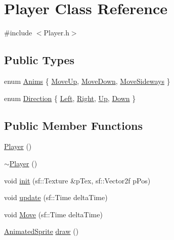 \hypertarget{class_player}{}\section{Player Class Reference}
\label{class_player}


{\ttfamily \#include $<$Player.\+h$>$}

\subsection*{Public Types}
\begin{DoxyCompactItemize}
\item 
enum \hyperlink{class_player_a1b51e48b90ffe011fc7af564f81b0a7f}{Anims} \{ \hyperlink{class_player_a1b51e48b90ffe011fc7af564f81b0a7fa6c74df21e9d4e850dd175a23b78c6540}{Move\+Up}, 
\hyperlink{class_player_a1b51e48b90ffe011fc7af564f81b0a7fa685fada3f0a5111b3b8e56f5357a05b0}{Move\+Down}, 
\hyperlink{class_player_a1b51e48b90ffe011fc7af564f81b0a7faf9fe61ee0da8fbb87e4b53da9a6e9a03}{Move\+Sideways}
 \}
\item 
enum \hyperlink{class_player_ad1b5932229b5d87c3dbca5bfcacb6936}{Direction} \{ \hyperlink{class_player_ad1b5932229b5d87c3dbca5bfcacb6936a52a7540bc447dcd5b888131396d3980e}{Left}, 
\hyperlink{class_player_ad1b5932229b5d87c3dbca5bfcacb6936ae36562fe9960c3bdac70addfd9694b97}{Right}, 
\hyperlink{class_player_ad1b5932229b5d87c3dbca5bfcacb6936a086ad5e6686e1540d2e0a09ca9ffc624}{Up}, 
\hyperlink{class_player_ad1b5932229b5d87c3dbca5bfcacb6936af654e304331768c532162a09347a597f}{Down}
 \}
\end{DoxyCompactItemize}
\subsection*{Public Member Functions}
\begin{DoxyCompactItemize}
\item 
\hyperlink{class_player_affe0cc3cb714f6deb4e62f0c0d3f1fd8}{Player} ()
\item 
\hyperlink{class_player_a749d2c00e1fe0f5c2746f7505a58c062}{$\sim$\+Player} ()
\item 
void \hyperlink{class_player_a66ab1b1a0569de7d1e83350e939a1d40}{init} (sf\+::\+Texture \&p\+Tex, sf\+::\+Vector2f p\+Pos)
\item 
void \hyperlink{class_player_aeb1ca63f5401afa5d6aef2f308481672}{update} (sf\+::\+Time delta\+Time)
\item 
void \hyperlink{class_player_aab4ff61041f937e6c3d560863fa46f56}{Move} (sf\+::\+Time delta\+Time)
\item 
\hyperlink{class_animated_sprite}{Animated\+Sprite} \hyperlink{class_player_af9e361fd707a32d86ff1a0f75fb2c3b2}{draw} ()
\end{DoxyCompactItemize}

